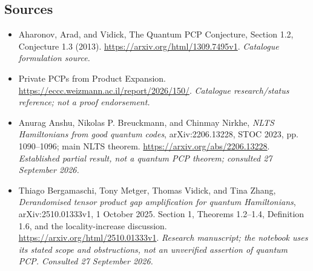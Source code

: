 \documentclass[11pt,a4paper]{article}
\numberwithin{equation}{section}
\begin{document}
\subsection{Sources}
\begin{itemize}\raggedright
\item[\textnormal{[S1]}]\hypertarget{source:statement:1}{} Aharonov, Arad, and Vidick, The Quantum PCP Conjecture, Section 1.2, Conjecture 1.3 (2013).
\url{https://arxiv.org/html/1309.7495v1}.
{\small\textit{Catalogue formulation source.}}
\item[\textnormal{[S2]}]\hypertarget{source:statement:2}{} Private PCPs from Product Expansion.
\url{https://eccc.weizmann.ac.il/report/2026/150/}.
{\small\textit{Catalogue research/status reference; not a proof endorsement.}}
\item[\textnormal{[E1]}]\hypertarget{extra:statement:1}{} Anurag Anshu, Nikolas P. Breuckmann,
and Chinmay Nirkhe, \emph{NLTS Hamiltonians from good quantum codes},
arXiv:2206.13228, STOC 2023, pp. 1090--1096; main NLTS theorem.
\url{https://arxiv.org/abs/2206.13228}.
{\small\textit{Established partial result, not a quantum PCP theorem;
consulted 27 September 2026.}}
\item[\textnormal{[E2]}]\hypertarget{extra:statement:2}{} Thiago Bergamaschi, Tony Metger,
Thomas Vidick, and Tina Zhang, \emph{Derandomised tensor product gap
amplification for quantum Hamiltonians}, arXiv:2510.01333v1,
1 October 2025. Section 1, Theorems 1.2--1.4, Definition 1.6,
and the locality-increase discussion.
\url{https://arxiv.org/html/2510.01333v1}.
{\small\textit{Research manuscript; the notebook uses its stated scope and
obstructions, not an unverified assertion of quantum PCP.
Consulted 27 September 2026.}}
\end{itemize}
\end{document}
